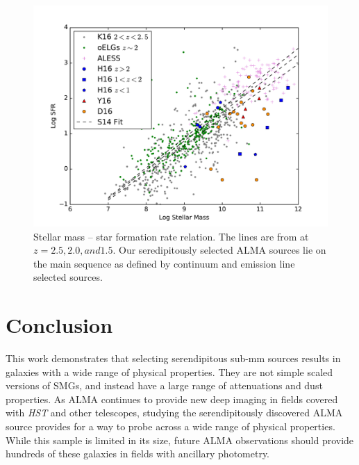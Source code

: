 \documentclass[preprint,natbib209]{aastex}
\begin{document}
\begin{figure}[t]
\centering
\includegraphics[scale=0.8]{main_seq.pdf}
\caption{Stellar mass -- star formation rate relation. The lines are from \cite{speagle14} at $z = 2.5, 2.0, and 1.5$. Our seredipitously selected ALMA sources lie on the main sequence as defined by continuum and emission line selected sources.}
\label{fig:mainseq}
\end{figure}



\section{Conclusion}
\label{sec:conclusion}

This work demonstrates that selecting serendipitous sub-mm sources results in galaxies with a wide range of physical properties. They are not simple scaled versions of SMGs, and instead have a large range of attenuations and dust properties. As ALMA continues to provide new deep imaging in fields covered with \textit{HST} and other telescopes, studying the serendipitously discovered ALMA source provides for a way to probe across a wide range of physical properties. While this sample is limited in its size, future ALMA observations should provide hundreds of these galaxies in fields with ancillary photometry.

\acknowledgments
\end{document}
